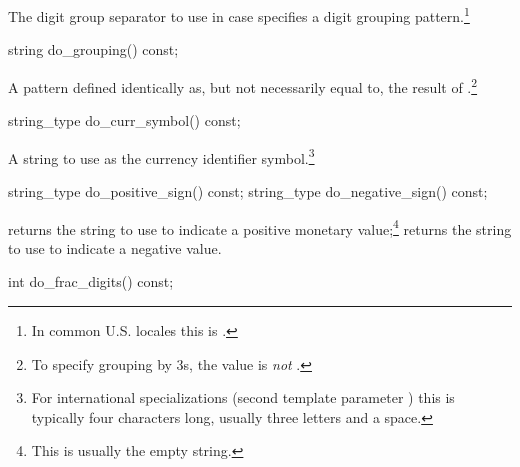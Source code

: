 \begin{itemdescr}
\pnum
\returns
The digit group separator to use in case
specifies a digit grouping pattern.\footnote{In common U.S. locales this is
.}
\end{itemdescr}

%
%
\begin{itemdecl}
string do_grouping() const;
\end{itemdecl}

\begin{itemdescr}
\pnum
\returns
A pattern defined identically as, but not necessarily equal to, the result of
.\footnote{To specify grouping by 3s,
the value is 
\textit{not}
.}
\end{itemdescr}

%
%
\begin{itemdecl}
string_type do_curr_symbol() const;
\end{itemdecl}

\begin{itemdescr}
\pnum
\returns
A string to use as the currency identifier symbol.\footnote{For international
specializations (second template parameter
)
this is typically four characters long, usually three letters and a space.}
\end{itemdescr}

%
%
%
%
\begin{itemdecl}
string_type do_positive_sign() const;
string_type do_negative_sign() const;
\end{itemdecl}

\begin{itemdescr}
\pnum
\returns
{}
returns the string to use to indicate a
positive monetary value;\footnote{This is usually the empty string.}
returns the string to use to indicate a negative value.
\end{itemdescr}

%
%
\begin{itemdecl}
int do_frac_digits() const;
\end{itemdecl}

